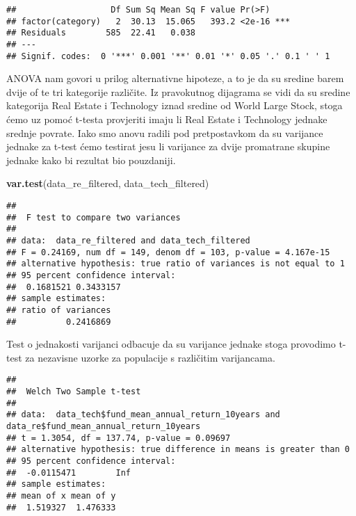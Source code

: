 \documentclass[
]{article}
\newenvironment{Shaded}{\begin{snugshade}}{\end{snugshade}}
\newcommand{\DataTypeTok}[1]{\textcolor[rgb]{0.13,0.29,0.53}{#1}}
\newcommand{\KeywordTok}[1]{\textcolor[rgb]{0.13,0.29,0.53}{\textbf{#1}}}
\newcommand{\NormalTok}[1]{#1}
\newcommand{\OperatorTok}[1]{\textcolor[rgb]{0.81,0.36,0.00}{\textbf{#1}}}
\newcommand{\OtherTok}[1]{\textcolor[rgb]{0.56,0.35,0.01}{#1}}
\newcommand{\StringTok}[1]{\textcolor[rgb]{0.31,0.60,0.02}{#1}}
\begin{document}
\begin{verbatim}
##                   Df Sum Sq Mean Sq F value Pr(>F)    
## factor(category)   2  30.13  15.065   393.2 <2e-16 ***
## Residuals        585  22.41   0.038                   
## ---
## Signif. codes:  0 '***' 0.001 '**' 0.01 '*' 0.05 '.' 0.1 ' ' 1
\end{verbatim}

ANOVA nam govori u prilog alternativne hipoteze, a to je da su sredine
barem dvije of te tri kategorije različite. Iz pravokutnog dijagrama se
vidi da su sredine kategorija Real Estate i Technology iznad sredine od
World Large Stock, stoga ćemo uz pomoć t-testa provjeriti imaju li Real
Estate i Technology jednake srednje povrate. Iako smo anovu radili pod
pretpostavkom da su varijance jednake za t-test ćemo testirat jesu li
varijance za dvije promatrane skupine jednake kako bi rezultat bio
pouzdaniji.

\begin{Shaded}
\begin{Highlighting}[]
\KeywordTok{var.test}\NormalTok{(data_re_filtered, data_tech_filtered)}
\end{Highlighting}
\end{Shaded}

\begin{verbatim}
## 
##  F test to compare two variances
## 
## data:  data_re_filtered and data_tech_filtered
## F = 0.24169, num df = 149, denom df = 103, p-value = 4.167e-15
## alternative hypothesis: true ratio of variances is not equal to 1
## 95 percent confidence interval:
##  0.1681521 0.3433157
## sample estimates:
## ratio of variances 
##          0.2416869
\end{verbatim}

Test o jednakosti varijanci odbacuje da su varijance jednake stoga
provodimo t-test za nezavisne uzorke za populacije s različitim
varijancama.

\begin{Shaded}
\end{Shaded}

\begin{verbatim}
## 
##  Welch Two Sample t-test
## 
## data:  data_tech$fund_mean_annual_return_10years and data_re$fund_mean_annual_return_10years
## t = 1.3054, df = 137.74, p-value = 0.09697
## alternative hypothesis: true difference in means is greater than 0
## 95 percent confidence interval:
##  -0.0115471        Inf
## sample estimates:
## mean of x mean of y 
##  1.519327  1.476333
\end{verbatim}
\end{document}

